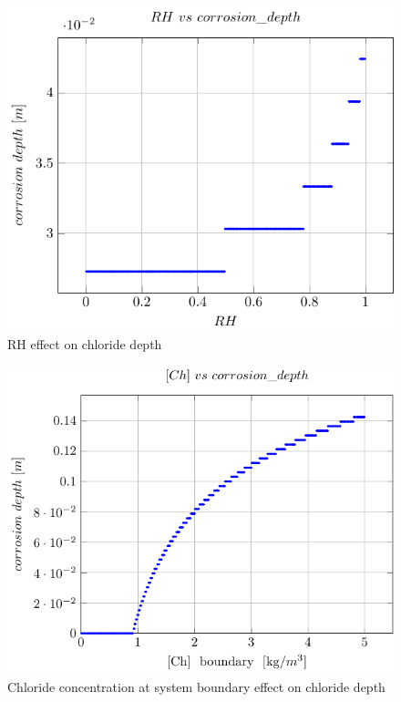 \begin{figure}[H]
    \centering
    \includegraphics[width=\linewidth]{imgs/pdfs/11_RH_corr.pdf}
    \caption{RH effect on chloride depth}\label{RH vs chloride depth}
\end{figure}
\begin{figure}[H]
    \centering
    \includegraphics[width=\linewidth]{imgs/pdfs/11_Chloride_corr.pdf}
    \caption{Chloride concentration at system boundary effect on chloride depth}\label{Chloride vs corrosion depth}
\end{figure}


